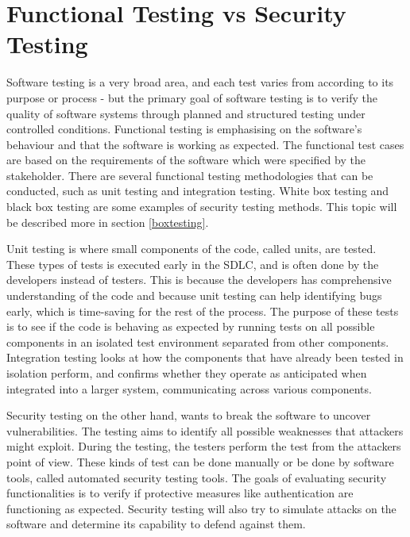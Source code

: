 \section{Functional Testing vs Security Testing}
Software testing is a very broad area, and each test varies from according to its purpose or process - but the primary goal of software testing is to verify the quality of software systems through planned and structured testing under controlled conditions. Functional testing is emphasising on the software's behaviour and that the software is working as expected. The functional test cases are based on the requirements of the software which were specified by the stakeholder. There are several functional testing methodologies that can be conducted, such as unit testing and integration testing. White box testing and black box testing are some examples of security testing methods. This topic will be described more in section \ref{boxtesting}. 
\cite{difftesting} 

Unit testing is where small components of the code, called units, are tested. These types of tests is executed early in the SDLC, and is often done by the developers instead of testers. This is because the developers has comprehensive understanding of the code and because unit testing can help identifying bugs early, which is time-saving for the rest of the process. The purpose of these tests is to see if the code is behaving as expected by running tests on all possible components in an isolated test environment separated from other components. Integration testing looks at how the components that have already been tested in isolation perform, and confirms whether they operate as anticipated when integrated into a larger system, communicating across various components.\cite{unitvsintergration}

Security testing on the other hand, wants to break the software to uncover vulnerabilities. The testing aims to identify all possible weaknesses that attackers might exploit. During the testing, the testers perform the test from the attackers point of view. These kinds of test can be done manually or be done by software tools, called automated security testing tools. The goals of evaluating security functionalities is to verify if protective measures like authentication are functioning as expected. Security testing will also try to simulate attacks on the software and determine its capability to defend against them.\cite{whysectest}





